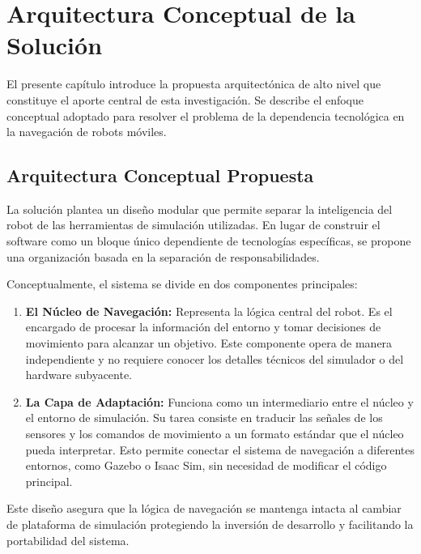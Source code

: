 \doublespacing

\chapter{Arquitectura Conceptual de la Solución}

El presente capítulo introduce la propuesta arquitectónica de alto nivel que constituye el aporte central de esta investigación. Se describe el enfoque conceptual adoptado para resolver el problema de la dependencia tecnológica en la navegación de robots móviles.

\section{Arquitectura Conceptual Propuesta}

La solución plantea un diseño modular que permite separar la inteligencia del robot de las herramientas de simulación utilizadas. En lugar de construir el software como un bloque único dependiente de tecnologías específicas, se propone una organización basada en la separación de responsabilidades.

Conceptualmente, el sistema se divide en dos componentes principales:

\begin{enumerate}
    \item \textbf{El Núcleo de Navegación:} Representa la lógica central del robot. Es el encargado de procesar la información del entorno y tomar decisiones de movimiento para alcanzar un objetivo. Este componente opera de manera independiente y no requiere conocer los detalles técnicos del simulador o del hardware subyacente.
    
    \item \textbf{La Capa de Adaptación:} Funciona como un intermediario entre el núcleo y el entorno de simulación. Su tarea consiste en traducir las señales de los sensores y los comandos de movimiento a un formato estándar que el núcleo pueda interpretar. Esto permite conectar el sistema de navegación a diferentes entornos, como Gazebo o Isaac Sim, sin necesidad de modificar el código principal.
\end{enumerate}

Este diseño asegura que la lógica de navegación se mantenga intacta al cambiar de plataforma de simulación protegiendo la inversión de desarrollo y facilitando la portabilidad del sistema.
